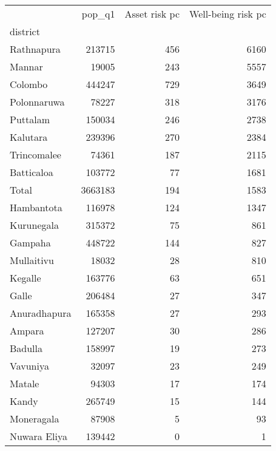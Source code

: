 \begin{tabular}{lrrr}
\toprule
{} &   pop\_q1 &  Asset risk pc &  Well-being risk pc \\
district     &          &                &                     \\
\midrule
Rathnapura   &   213715 &            456 &                6160 \\
Mannar       &    19005 &            243 &                5557 \\
Colombo      &   444247 &            729 &                3649 \\
Polonnaruwa  &    78227 &            318 &                3176 \\
Puttalam     &   150034 &            246 &                2738 \\
Kalutara     &   239396 &            270 &                2384 \\
Trincomalee  &    74361 &            187 &                2115 \\
Batticaloa   &   103772 &             77 &                1681 \\
Total        &  3663183 &            194 &                1583 \\
Hambantota   &   116978 &            124 &                1347 \\
Kurunegala   &   315372 &             75 &                 861 \\
Gampaha      &   448722 &            144 &                 827 \\
Mullaitivu   &    18032 &             28 &                 810 \\
Kegalle      &   163776 &             63 &                 651 \\
Galle        &   206484 &             27 &                 347 \\
Anuradhapura &   165358 &             27 &                 293 \\
Ampara       &   127207 &             30 &                 286 \\
Badulla      &   158997 &             19 &                 273 \\
Vavuniya     &    32097 &             23 &                 249 \\
Matale       &    94303 &             17 &                 174 \\
Kandy        &   265749 &             15 &                 144 \\
Moneragala   &    87908 &              5 &                  93 \\
Nuwara Eliya &   139442 &              0 &                   1 \\
\bottomrule
\end{tabular}
